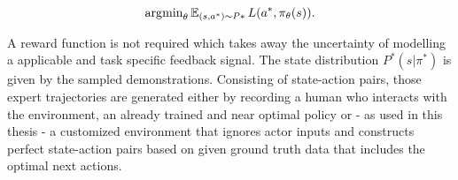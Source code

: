 \begin{equation}
\operatorname{\arg\!\min}_\theta \operatorname{\mathbb{E}}_{(s,a^*) \sim P*} L(a^*, \pi_\theta(s)).
\end{equation}

A reward function is not required which takes away the uncertainty of modelling a applicable and task specific feedback signal. The state distribution $P^*(s|\pi^*)$ is given by the sampled demonstrations. Consisting of state-action pairs, those expert trajectories are generated either by recording a human who interacts with the environment, an already trained and near optimal policy or - as used in this thesis - a customized environment that ignores actor inputs and constructs perfect state-action pairs based on given ground truth data that includes the optimal next actions.
